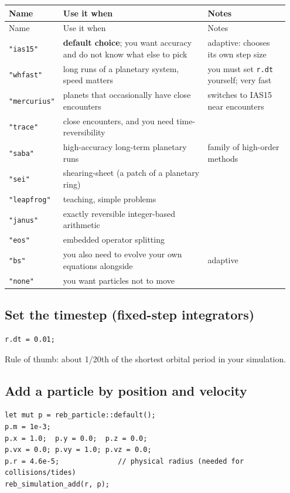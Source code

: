 \documentclass[11pt]{article}
\begin{document}
\begin{longtable}{L{0.100\linewidth}L{0.548\linewidth}L{0.301\linewidth}}
\toprule
Name & Use it when & Notes \\
\midrule
\endfirsthead
\toprule
Name & Use it when & Notes \\
\midrule
\endhead
\texttt{"ias15"} & \textbf{default choice}; you want accuracy and do not know what else to pick & adaptive: chooses its own step size \\
\texttt{"whfast"} & long runs of a planetary system, speed matters & you must set \texttt{r.dt} yourself; very fast \\
\texttt{"mercurius"} & planets that occasionally have close encounters & switches to IAS15 near encounters \\
\texttt{"trace"} & close encounters, and you need time-reversibility &  \\
\texttt{"saba"} & high-accuracy long-term planetary runs & family of high-order methods \\
\texttt{"sei"} & shearing-sheet (a patch of a planetary ring) &  \\
\texttt{"leapfrog"} & teaching, simple problems &  \\
\texttt{"janus"} & exactly reversible integer-based arithmetic &  \\
\texttt{"eos"} & embedded operator splitting &  \\
\texttt{"bs"} & you also need to evolve your own equations alongside & adaptive \\
\texttt{"none"} & you want particles not to move &  \\
\bottomrule
\end{longtable}

\subsection{Set the timestep (fixed-step integrators)}

\begin{lstlisting}
r.dt = 0.01;
\end{lstlisting}

Rule of thumb: about 1/20th of the shortest orbital period in your simulation.

\subsection{Add a particle by position and velocity}

\begin{lstlisting}
let mut p = reb_particle::default();
p.m = 1e-3;
p.x = 1.0;  p.y = 0.0;  p.z = 0.0;
p.vx = 0.0; p.vy = 1.0; p.vz = 0.0;
p.r = 4.6e-5;              // physical radius (needed for collisions/tides)
reb_simulation_add(r, p);
\end{lstlisting}
\end{document}
